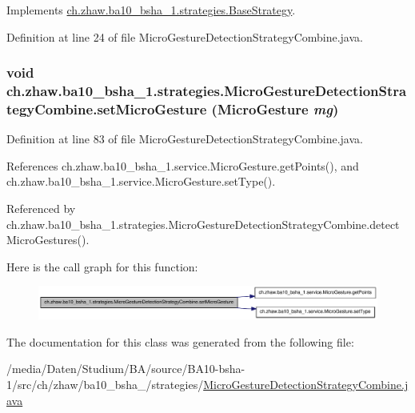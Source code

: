 Implements \hyperlink{classch_1_1zhaw_1_1ba10__bsha__1_1_1strategies_1_1BaseStrategy_af6ea27835befac71906915236a347450}{ch.zhaw.ba10\_\-bsha\_\-1.strategies.BaseStrategy}.

Definition at line 24 of file MicroGestureDetectionStrategyCombine.java.\hypertarget{classch_1_1zhaw_1_1ba10__bsha__1_1_1strategies_1_1MicroGestureDetectionStrategyCombine_a06f12711cc267a6f8647dfb6faeb4787}{
\subsubsection[{setMicroGesture}]{\setlength{\rightskip}{0pt plus 5cm}void ch.zhaw.ba10\_\-bsha\_\-1.strategies.MicroGestureDetectionStrategyCombine.setMicroGesture ({\bf MicroGesture} {\em mg})}}
\label{classch_1_1zhaw_1_1ba10__bsha__1_1_1strategies_1_1MicroGestureDetectionStrategyCombine_a06f12711cc267a6f8647dfb6faeb4787}


Definition at line 83 of file MicroGestureDetectionStrategyCombine.java.

References ch.zhaw.ba10\_\-bsha\_\-1.service.MicroGesture.getPoints(), and ch.zhaw.ba10\_\-bsha\_\-1.service.MicroGesture.setType().

Referenced by ch.zhaw.ba10\_\-bsha\_\-1.strategies.MicroGestureDetectionStrategyCombine.detectMicroGestures().

Here is the call graph for this function:\nopagebreak
\begin{figure}[H]
\begin{center}
\leavevmode
\includegraphics[width=372pt]{classch_1_1zhaw_1_1ba10__bsha__1_1_1strategies_1_1MicroGestureDetectionStrategyCombine_a06f12711cc267a6f8647dfb6faeb4787_cgraph}
\end{center}
\end{figure}


The documentation for this class was generated from the following file:\begin{DoxyCompactItemize}
\item 
/media/Daten/Studium/BA/source/BA10-\/bsha-\/1/src/ch/zhaw/ba10\_\-bsha\_/strategies/\hyperlink{MicroGestureDetectionStrategyCombine_8java}{MicroGestureDetectionStrategyCombine.java}\end{DoxyCompactItemize}
